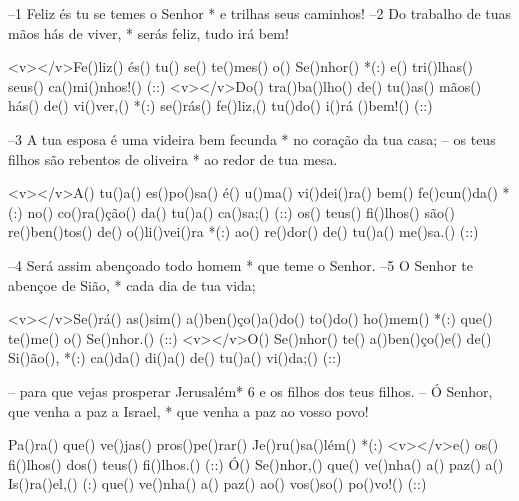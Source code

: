 –1 Feliz és tu se temes o Senhor *
e trilhas seus caminhos!
–2 Do trabalho de tuas mãos hás de viver, *
serás feliz, tudo irá bem!

<v></v>Fe()liz() és() tu() se() te()mes() o() Se()nhor() *(:)
e() tri()lhas() seus() ca()mi()nhos!() (::)
<v></v>Do() tra()ba()lho() de() tu()as() mãos() hás() de() vi()ver,() *(:)
se()rás() fe()liz,() tu()do() i()rá ()bem!() (::)

–3 A tua esposa é uma videira bem fecunda *
no coração da tua casa;
– os teus filhos são rebentos de oliveira *
ao redor de tua mesa.

<v></v>A() tu()a() es()po()sa() é() u()ma() vi()dei()ra() bem() fe()cun()da() *(:)
no() co()ra()ção() da() tu()a() ca()sa;() (::)
os() teus() fi()lhos() são() re()ben()tos() de() o()li()vei()ra *(:)
ao() re()dor() de() tu()a() me()sa.() (::)

–4 Será assim abençoado todo homem *
que teme o Senhor.
–5 O Senhor te abençoe de Sião, *
cada dia de tua vida;

<v></v>Se()rá() as()sim() a()ben()ço()a()do() to()do() ho()mem() *(:)
que() te()me() o() Se()nhor.() (::)
<v></v>O() Se()nhor() te() a()ben()ço()e() de() Si()ão(), *(:)
ca()da() di()a() de() tu()a() vi()da;() (::)

– para que vejas prosperar Jerusalém*
6 e os filhos dos teus filhos.
– Ó Senhor, que venha a paz a Israel, *
que venha a paz ao vosso povo!

Pa()ra() que() ve()jas() pros()pe()rar() Je()ru()sa()lém() *(:)
<v></v>e() os() fi()lhos() dos() teus() fi()lhos.() (::)
Ó() Se()nhor,() que() ve()nha() a() paz() a() Is()ra()el,() (:)
que() ve()nha() a() paz() ao() vos()so() po()vo!() (::)